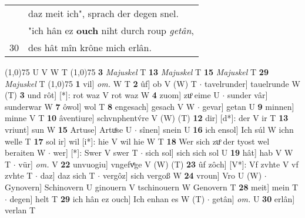 \documentclass[8pt,a4paper,notitlepage]{article}
\begin{document}
\begin{table}[ht]
\begin{minipage}[t]{0.5\linewidth}
\begin{tabular}{rl}
 & daz meit ich", sprach der degen snel.\\ 
 & "ich hân ez \textbf{ouch} niht durch roup \textit{getân},\\ 
30 & des hât mîn krône mich erlân.\\ 
\end{tabular}
\scriptsize
\line(1,0){75} \newline
U V W T \newline
\line(1,0){75} \newline
\textbf{3} \textit{Majuskel} T  \textbf{13} \textit{Majuskel} T  \textbf{15} \textit{Majuskel} T  \textbf{29} \textit{Majuskel} T  \newline
\line(1,0){75} \newline
\textbf{1} vil] \textit{om.} W T \textbf{2} ûf] ob V (W) T  $\cdot$ tavelrunder] tauelrunde W (T) \textbf{3} und rôt] [*]: rot waz V rot waz W \textbf{4} zuom] zuͦ eime U  $\cdot$ sunder vâr] sunderwar W \textbf{7} ôwol] wol T \textbf{8} engesach] gesach V W  $\cdot$ gevar] getan U \textbf{9} minnen] minne V T \textbf{10} âventiure] schvnphentv́re V (W) (T) \textbf{12} dir] [d*]: der V ir T \textbf{13} vriunt] sun W \textbf{15} Artuse] Artuͦse U  $\cdot$ sînen] snein U \textbf{16} ich ensol] Ich súl W ichn welle T \textbf{17} sol ir] wil [i*]: hie V wil hie W T \textbf{18} Wer sich zuͦ der tyost wel beraiten W  $\cdot$ wer] [*]: Swer V swer T  $\cdot$ sich sol] sich sich sol U \textbf{19} hât] hab V W T  $\cdot$ vür] \textit{om.} V \textbf{22} unvuogiu] vngefvͤge V (W) (T) \textbf{23} ûf zôch] [V*]: Vf zvhte V vf zvhte T  $\cdot$ daz] daz sich T  $\cdot$ vergôz] sich vergoß W \textbf{24} vroun] Vro U (W)  $\cdot$ Gynovern] Schinovern U ginouern V tschinouern W Genovern T \textbf{28} meit] mein T  $\cdot$ degen] helt T \textbf{29} ich hân ez ouch] Ich enhan es W (T)  $\cdot$ getân] \textit{om.} U \textbf{30} erlân] verlan T \newline
\end{minipage}
\end{table}
\end{document}
